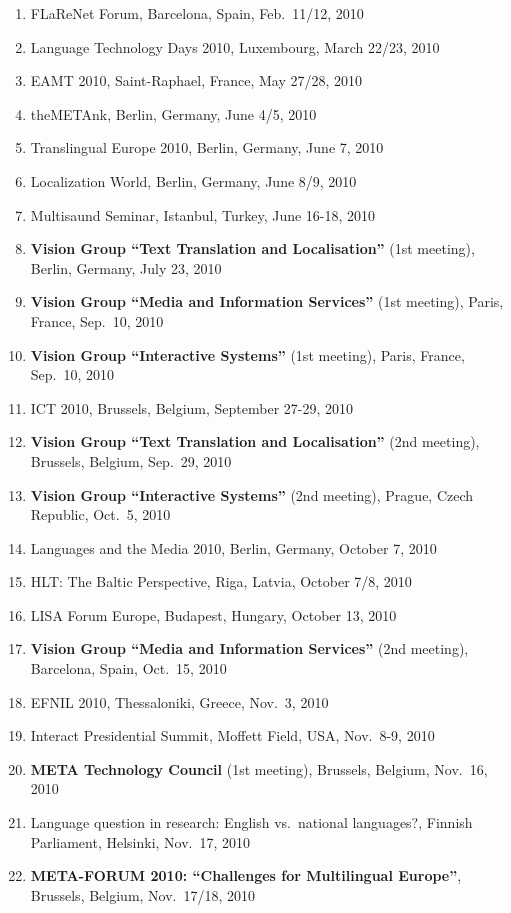 \documentclass[10pt, plain]{../../metanetpaper}
\begin{document}
\begin{footnotesize}
\begin{enumerate}
\item FLaReNet Forum, Barcelona, Spain, Feb.~11/12, 2010
\item Language Technology Days 2010, Luxembourg, March 22/23, 2010
\item EAMT 2010, Saint-Raphael, France, May 27/28, 2010
\item theMETAnk, Berlin, Germany, June 4/5, 2010
\item Translingual Europe 2010, Berlin, Germany, June 7, 2010
\item Localization World, Berlin, Germany, June 8/9, 2010
\item Multisaund Seminar, Istanbul, Turkey, June 16-18, 2010
\item \textbf{Vision Group ``Text Translation and Localisation''} (1st meeting), Berlin, Germany, July 23, 2010
\item \textbf{Vision Group ``Media and Information Services''} (1st meeting), Paris, France, Sep.~10, 2010
\item \textbf{Vision Group ``Interactive Systems''} (1st meeting), Paris, France, Sep.~10, 2010
\item ICT 2010, Brussels, Belgium, September 27-29, 2010
\item \textbf{Vision Group ``Text Translation and Localisation''} (2nd meeting), Brussels, Belgium, Sep.~29, 2010
\item \textbf{Vision Group ``Interactive Systems''} (2nd meeting), Prague, Czech Republic, Oct.~5, 2010
\item Languages and the Media 2010, Berlin, Germany, October 7, 2010
\item HLT: The Baltic Perspective, Riga, Latvia, October 7/8, 2010
\item LISA Forum Europe, Budapest, Hungary, October 13, 2010
\item \textbf{Vision Group ``Media and Information Services''} (2nd meeting), Barcelona, Spain, Oct.~15, 2010
\item EFNIL 2010, Thessaloniki, Greece, Nov.~3, 2010
\item Interact Presidential Summit, Moffett Field, USA, Nov.~8-9, 2010
\item \textbf{META Technology Council} (1st meeting), Brussels, Belgium, Nov.~16, 2010
\item Language question in research: English vs.~national languages?, Finnish Parliament, Helsinki, Nov.~17, 2010
\item \textbf{META-FORUM 2010: ``Challenges for Multilingual Europe''}, Brussels, Belgium, Nov.~17/18, 2010

\end{enumerate}
\end{footnotesize}
\end{document}
